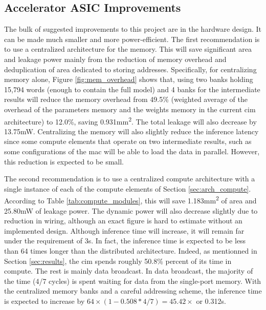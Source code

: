 \subsection{Accelerator ASIC Improvements}
The bulk of suggested improvements to this project are in the hardware design. It can be made much smaller and more power-efficient. The first recommendation is to use a centralized
architecture for the memory. This will save significant area and leakage power mainly from the reduction of memory overhead and deduplication of area dedicated to storing addresses.
Specifically, for centralizing memory alone, Figure \ref{fig:mem_overhead} shows that, using two banks holding 15,794 words (enough to contain the full model) and 4 banks for the
intermediate results will reduce the memory overhead from 49.5\% (weighted average of the overhead of the parameters memory and the weights memory in the current \ac{cim} architecture)
to 12.0\%, saving 0.931\si{\square\milli\meter}. The total leakage will also decrease by 13.75\si{\milli\watt}. Centralizing the memory will also slightly reduce the inference latency
since some compute elements that operate on two intermediate results, such as some configurations of the \ac{mac} will be able to load the data in parallel. However, this reduction is
expected to be small.

The second recommendation is to use a centralized compute architecture with a single instance of each of the compute elements of Section \ref{sec:arch_compute}. According to Table
\ref{tab:compute_modules}, this will save 1.183\si{\square\milli\meter} of area and 25.80\si{\milli\watt} of leakage power. The dynamic power will also decrease slightly due to reduction
in wiring, although an exact figure is hard to estimate without an implemented design. Although inference time will increase, it will remain far under the requirement of 3s. In fact, the
inference time is expected to be less than 64 times longer than the distributed architecture. Indeed, as mentionned in Section \ref{sec:results}, the \ac{cim} spends roughly 50.8\% percent
of its time in compute. The rest is mainly data broadcast. In data broadcast, the majority of the time (4/7 cycles) is spent waiting for data from the single-port memory. With the
centralized memory banks and a careful addressing scheme, the inference time is expected to increase by $64\times(1-0.508*4/7) = 45.42\times$ or 0.312\si{\second}.


